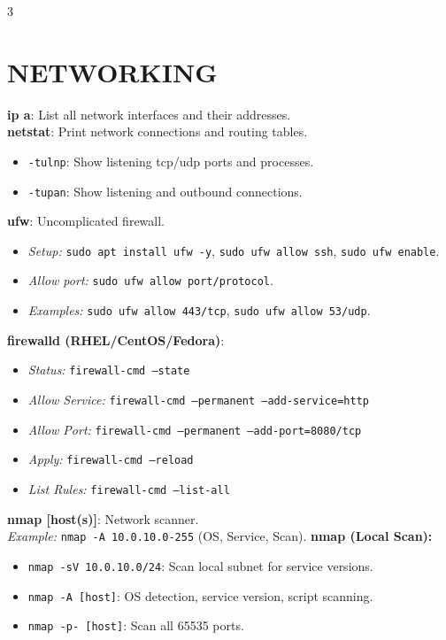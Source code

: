 \documentclass[7pt,landscape]{article}
\begin{document}
\begin{multicols*}{3}
\section{NETWORKING}
\textbf{ip a}: List all network interfaces and their addresses. \\
\textbf{netstat}: Print network connections and routing tables.
\begin{itemize}
    \item \texttt{-tulnp}: Show listening tcp/udp ports and processes.
    \item \texttt{-tupan}: Show listening and outbound connections.
\end{itemize}
\textbf{ufw}: Uncomplicated firewall.
\begin{itemize}
    \item \textit{Setup:} \texttt{sudo apt install ufw -y}, \texttt{sudo ufw allow ssh}, \texttt{sudo ufw enable}.
    \item \textit{Allow port:} \texttt{sudo ufw allow port/protocol}.
    \item \textit{Examples:} \texttt{sudo ufw allow 443/tcp}, \texttt{sudo ufw allow 53/udp}.
\end{itemize}
\textbf{firewalld (RHEL/CentOS/Fedora)}:
\begin{itemize}
    \item \textit{Status:} \texttt{firewall-cmd --state}
    \item \textit{Allow Service:} \texttt{firewall-cmd --permanent --add-service=http}
    \item \textit{Allow Port:} \texttt{firewall-cmd --permanent --add-port=8080/tcp}
    \item \textit{Apply:} \texttt{firewall-cmd --reload}
    \item \textit{List Rules:} \texttt{firewall-cmd --list-all}
\end{itemize}
\textbf{nmap [host(s)]}: Network scanner. \\
\textit{Example:} \texttt{nmap -A 10.0.10.0-255} (OS, Service, Scan).
\textbf{nmap (Local Scan):}
\begin{itemize}
    \item \texttt{nmap -sV 10.0.10.0/24}: Scan local subnet for service versions.
    \item \texttt{nmap -A [host]}: OS detection, service version, script scanning.
    \item \texttt{nmap -p- [host]}: Scan all 65535 ports.
\end{itemize}


\end{multicols*}
\end{document}
